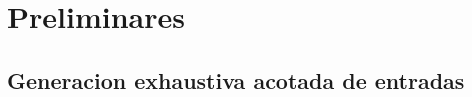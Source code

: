 \chapter[Preliminares]{Preliminares}
\label{cap:preliminares.BE}
\section{Generacion exhaustiva acotada  de entradas}
\label{sec:BE}


